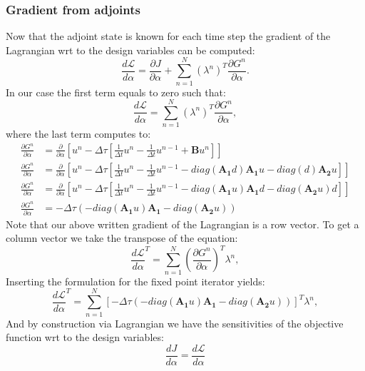 \documentclass[10pt]{article}
\begin{document}
\subsubsection*{Gradient from adjoints}
Now that the adjoint state is known for each time step the gradient of the Lagrangian wrt to the design variables can be computed:
\begin{equation}
\frac{d \mathcal L}{d \alpha} = \frac{\partial J}{\partial \alpha} + \sum_{n=1}^{N} \left( \lambda^n \right)^T \frac{\partial G^n}{\partial \alpha}.
\end{equation}
In our case the first term equals to zero such that:
\begin{equation}
\frac{d \mathcal L}{d \alpha} =  \sum_{n=1}^{N} \left( \lambda^n \right)^T \frac{\partial G^n}{\partial \alpha},
\end{equation}
where the last term computes to:
\begin{align}
\frac{\partial G^n}{\partial \alpha} &= \frac{\partial}{\partial \alpha}\left[ u^n - \Delta\tau\left[ \frac{1}{\Delta t} u^{n} - \frac{1}{\Delta t} u^{n-1} + \mathbf{B}u^n  \right] \right] \\
\frac{\partial G^n}{\partial \alpha} &= \frac{\partial}{\partial \alpha}\left[ u^n - \Delta\tau\left[ \frac{1}{\Delta t} u^{n} - \frac{1}{\Delta t} u^{n-1} -diag(\mathbf{A_1}d)\mathbf{A_1}u - diag(d) \mathbf{A_2}u  \right] \right]\\
\frac{\partial G^n}{\partial \alpha} &= \frac{\partial}{\partial \alpha}\left[ u^n - \Delta\tau\left[ \frac{1}{\Delta t} u^{n} - \frac{1}{\Delta t} u^{n-1} -diag(\mathbf{A_1}u)\mathbf{A_1}d - diag(\mathbf{A_2}u) d  \right] \right] \\
\frac{\partial G^n}{\partial \alpha} &= -\Delta\tau \left(-diag(\mathbf{A_1}u)\mathbf{A_1} - diag(\mathbf{A_2}u) \right)
\end{align}
Note that our above written gradient of the Lagrangian is a row vector. To get a column vector we take the transpose of the equation:
\begin{equation}
\frac{d \mathcal L}{d \alpha}^T =  \sum_{n=1}^{N} \left( \frac{\partial G^n}{\partial \alpha} \right)^T \lambda^n,
\end{equation}
Inserting the formulation for the fixed point iterator yields:
\begin{equation}
\frac{d \mathcal L}{d \alpha}^T =  \sum_{n=1}^{N} \left[-\Delta\tau \left( -diag(\mathbf{A_1}u)\mathbf{A_1} - diag(\mathbf{A_2}u) \right) \right]^T \lambda^n,
\end{equation}
And by construction via Lagrangian we have the sensitivities of the objective function wrt to the design variables:
\begin{equation}
\frac{d J}{d \alpha} =\frac{d \mathcal L}{d \alpha}
\end{equation}
\end{document}
